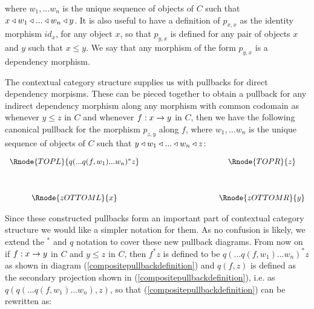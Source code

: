 \noindent where $w_1, ... w_n$ is the unique sequence of objects of $C$ such that 
$x \triangleleft w_1 \triangleleft ... \triangleleft w_n \triangleleft y$. It is also useful to have a definition of $p_{x,x}$ as the identity morphism
$id_x$, for any object $x$, so that $p_{y,x}$ is defined for any pair of objects $x$ and $y$ such that $x \leq y$.
We say that any morphism  of the form $p_{y,x}$ is a dependency morphism. 

The contextual category structure supplies us with pullbacks for direct dependency morpisms.
These can be pieced together to obtain  a pullback for any indirect dependency morphism   along any morphism with common codomain
as  whenever $y \leq z$ in $C$ and whenever $f:x \rightarrow y$ in $C$, then we have
the following canonical pullback for the morphism $p_{z, y}$ along $f$, where
$w_1, ... w_n$ is the unique sequence of objects of $C$ such that 
$y \triangleleft w_1 \triangleleft ... \triangleleft w_n \triangleleft z$:

\vspace{3mm}
\begin{center}
\begin{equation}
\label{compositepullbackdefinition}
\begin{array}{cp{2.9cm}c}
\Rnode{TOPL}{q(...q(f, w_1)...w_n)^* z} & & \Rnode{TOPR}{z}\\ [1.2cm]
\Rnode{zOTTOML}{x}         & & \Rnode{zOTTOMR}{y}
\end{array}
\end{equation}
\end{center}

Since these constructed pullbacks form an important part of contextual
category structure we would like a simpler notation for them. As no confusion is
likely, we extend the $^*$ and $q$ notation to cover these new pullback diagrams.
From now on if $f:x \rightarrow y$ in $C$ and $y \leq z$ in $C$, then $f^*z$ 
is defined to be $q(...q(f, w_1)...w_n)^* z$ as shown in diagram (\ref{compositepullbackdefinition}) 
and $q(f,z)$ is defined as the secondary projection shown in (\ref{compositepullbackdefinition}), i.e. as 
$q(q(...q(f,w_1)...w_n),z)$,
so that (\ref{compositepullbackdefinition}) can be rewritten as:

